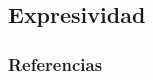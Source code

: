\documentclass[
compress,
xcolor=table,
dvipsnames,
]{beamer}
\begin{document}
    \subsection{Expresividad}



  
%
\begin{frame}
\frametitle{Referencias}

\insertBib

\end{frame}
\end{document}
